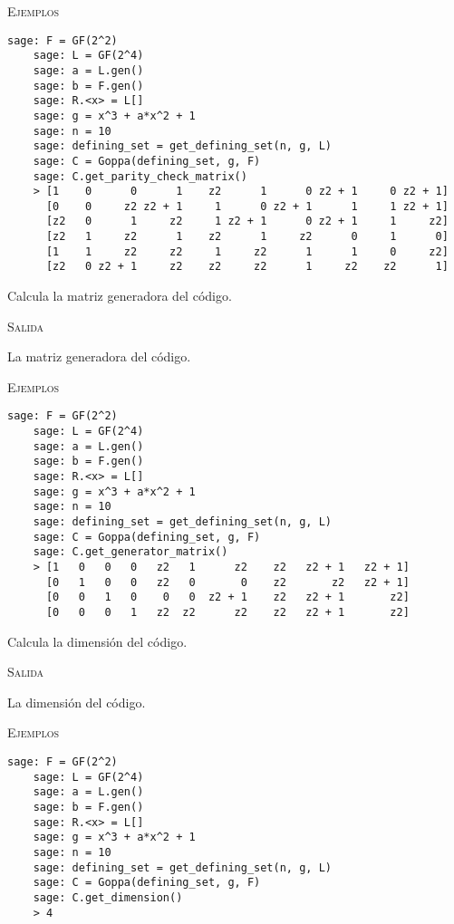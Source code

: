 \begin{description}[leftmargin=1em, font=\normalfont\ttfamily, style=nextline]
\begin{description}[font=\ttfamily, style=nextline]
  \textsc{Ejemplos}
  \begin{lstlisting}[gobble=4]
    sage: F = GF(2^2)
    sage: L = GF(2^4)
    sage: a = L.gen()
    sage: b = F.gen()
    sage: R.<x> = L[]
    sage: g = x^3 + a*x^2 + 1
    sage: n = 10
    sage: defining_set = get_defining_set(n, g, L)
    sage: C = Goppa(defining_set, g, F)
    sage: C.get_parity_check_matrix()
    > [1    0      0      1    z2      1      0 z2 + 1     0 z2 + 1]
      [0    0     z2 z2 + 1     1      0 z2 + 1      1     1 z2 + 1]
      [z2   0      1     z2     1 z2 + 1      0 z2 + 1     1     z2]
      [z2   1     z2      1    z2      1     z2      0     1      0]
      [1    1     z2     z2     1     z2      1      1     0     z2]
      [z2   0 z2 + 1     z2    z2     z2      1     z2    z2      1]
  \end{lstlisting}

  \item[get\_generator\_matrix(self)] Calcula la matriz generadora del código.
  
  \textsc{Salida}
  \begin{description}[font=\normalfont\ttfamily]
    \item[] La matriz generadora del código.
  \end{description}

  \textsc{Ejemplos}
  \begin{lstlisting}[gobble=4]
    sage: F = GF(2^2)
    sage: L = GF(2^4)
    sage: a = L.gen()
    sage: b = F.gen()
    sage: R.<x> = L[]
    sage: g = x^3 + a*x^2 + 1
    sage: n = 10
    sage: defining_set = get_defining_set(n, g, L)
    sage: C = Goppa(defining_set, g, F)
    sage: C.get_generator_matrix()
    > [1   0   0   0   z2   1      z2    z2   z2 + 1   z2 + 1]
      [0   1   0   0   z2   0       0    z2       z2   z2 + 1]
      [0   0   1   0    0   0  z2 + 1    z2   z2 + 1       z2]
      [0   0   0   1   z2  z2      z2    z2   z2 + 1       z2]
  \end{lstlisting}

  \item[get\_dimension(self)] Calcula la dimensión del código.
  
  \textsc{Salida}
  \begin{description}[font=\normalfont\ttfamily]
    \item[] La dimensión del código.
  \end{description}

  \textsc{Ejemplos}
  \begin{lstlisting}[gobble=4]
    sage: F = GF(2^2)
    sage: L = GF(2^4)
    sage: a = L.gen()
    sage: b = F.gen()
    sage: R.<x> = L[]
    sage: g = x^3 + a*x^2 + 1
    sage: n = 10
    sage: defining_set = get_defining_set(n, g, L)
    sage: C = Goppa(defining_set, g, F)
    sage: C.get_dimension()
    > 4
  \end{lstlisting}
  \end{description}
\end{description}

